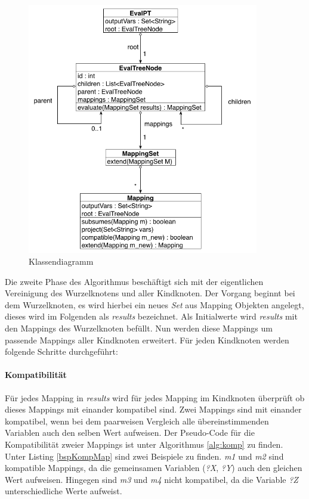 \documentclass[draft,final]{vutinfth} %
\begin{document}
\begin{figure}[ht]
	\centering
	\includegraphics[width=0.9\textwidth]{Klassendiagramm}
	\caption{Klassendiagramm}
	\label{klassendiagramm}
\end{figure}

Die zweite Phase des Algorithmus beschäftigt sich mit der eigentlichen Vereinigung des Wurzelknotens und aller Kindknoten. Der Vorgang beginnt bei dem Wurzelknoten, es wird hierbei ein neues \textit{Set} aus Mapping Objekten angelegt, dieses wird im Folgenden als \textit{results} bezeichnet. Als Initialwerte wird \textit{results} mit den Mappings des Wurzelknoten befüllt. Nun werden diese Mappings um passende Mappings aller Kindknoten erweitert. Für jeden Kindknoten werden folgende Schritte durchgeführt:

\paragraph{Kompatibilität}
Für jedes Mapping in \textit{results} wird für jedes Mapping im Kindknoten überprüft ob dieses Mappings mit einander kompatibel sind. Zwei Mappings sind mit einander kompatibel, wenn bei dem paarweisen Vergleich alle übereinstimmenden Variablen auch den selben Wert aufweisen. Der Pseudo-Code für die Kompatibilität zweier Mappings ist unter Algorithmus \ref{alg:komp} zu finden. \\ Unter Listing \ref{bspKompMap} sind zwei Beispiele zu finden. \textit{m1} und \textit{m2} sind kompatible Mappings, da die gemeinsamen Variablen (\textit{?X}, \textit{?Y}) auch den gleichen Wert aufweisen. Hingegen sind \textit{m3} und \textit{m4} nicht kompatibel, da die Variable \textit{?Z} unterschiedliche Werte aufweist.
\end{document}
